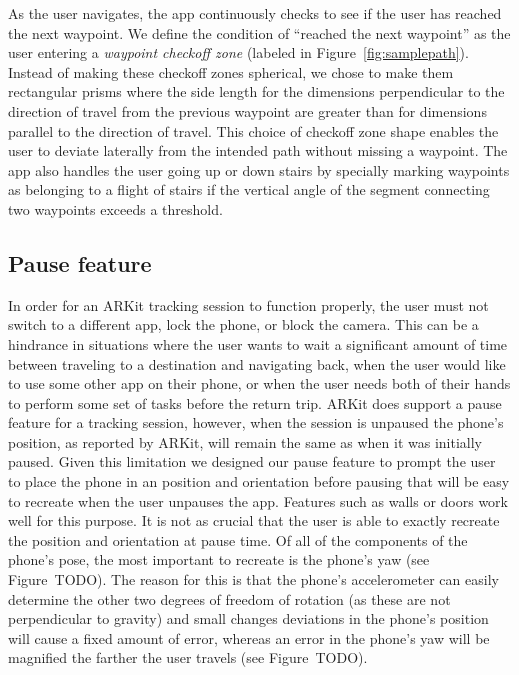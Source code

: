 \documentclass[chi_draft]{sigchi}
\begin{document}
As the user navigates, the app continuously checks to see if the user has reached the next waypoint.  We define the condition of ``reached the next waypoint'' as the user entering a \emph{waypoint checkoff zone} (labeled in Figure~\ref{fig:samplepath}).  Instead of making these checkoff zones spherical, we chose to make them rectangular prisms where the side length for the dimensions perpendicular to the direction of travel from the previous waypoint are greater than for dimensions parallel to the direction of travel.  This choice of checkoff zone shape enables the user to deviate laterally from the intended path without missing a waypoint.  The app also handles the user going up or down stairs by specially marking waypoints as belonging to a flight of stairs if the vertical angle of the segment connecting two waypoints exceeds a threshold.

\subsection{Pause feature}
In order for an ARKit tracking session to function properly, the user must not switch to a different app, lock the phone, or block the camera.  This can be a hindrance in situations where the user wants to wait a significant amount of time between traveling to a destination and navigating back, when the user would like to use some other app on their phone, or when the user needs both of their hands to perform some set of tasks before the return trip.  ARKit does support a pause feature for a tracking session, however, when the session is unpaused the phone's position, as reported by ARKit, will remain the same as when it was initially paused.  Given this limitation we designed our pause feature to prompt the user to place the phone in an position and orientation before pausing that will be easy to recreate when the user unpauses the app.  Features such as walls or doors work well for this purpose.  It is not as crucial that the user is able to exactly recreate the position and orientation at pause time.  Of all of the components of the phone's pose, the most important to recreate is the phone's yaw (see Figure~TODO).  The reason for this is that the phone's accelerometer can easily determine the other two degrees of freedom of rotation (as these are not perpendicular to gravity) and small changes deviations in the phone's position will cause a fixed amount of error, whereas an error in the phone's yaw will be magnified the farther the user travels (see Figure~TODO).
\end{document}
